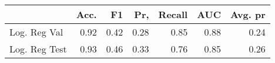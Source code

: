 \begin{tabular}{lrrrrrr}
\toprule
{} &  Acc. &    F1 &   Pr, &  Recall &   AUC &  Avg. pr \\
\midrule
Log. Reg Val  &  0.92 &  0.42 &  0.28 &    0.85 &  0.88 &     0.24 \\
Log. Reg Test &  0.93 &  0.46 &  0.33 &    0.76 &  0.85 &     0.26 \\
\bottomrule
\end{tabular}
